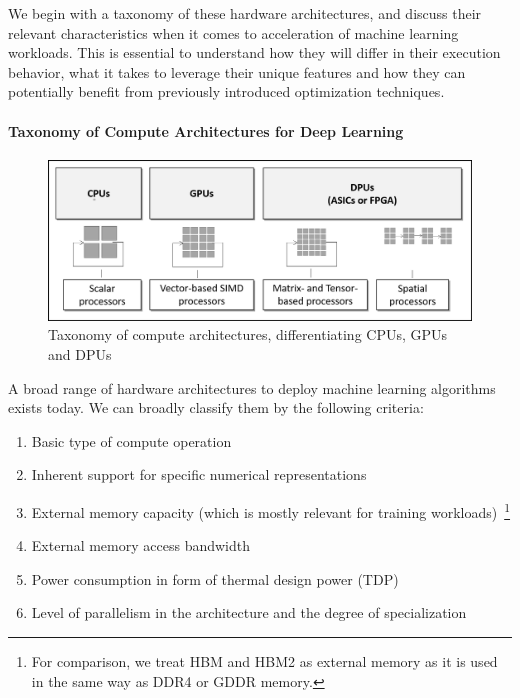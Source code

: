 We begin with a taxonomy of these hardware architectures, and discuss their relevant characteristics when it comes to acceleration of machine learning workloads. 
This is essential to understand how they will differ in their execution behavior, what it takes to leverage their unique features and how they can potentially benefit from previously introduced optimization techniques. 

\paragraph{Taxonomy of Compute Architectures for Deep Learning}

\begin{figure}
\centering
\includegraphics[width=0.8\linewidth]{figures/taxonomy.png}
\caption{Taxonomy of compute architectures, differentiating CPUs, GPUs and DPUs}
\label{fig:tax}
\end{figure}

A broad range of hardware architectures to deploy machine learning algorithms exists today.
We can broadly classify them by the following criteria:

\begin{enumerate}[itemsep=-1pt]
\item Basic type of compute operation
\item Inherent support for specific numerical representations
\item External memory capacity (which is mostly relevant for training workloads)~\footnote{For comparison, we treat HBM and HBM2 as external memory as it is used in the same way as DDR4 or GDDR memory.}
\item External memory access bandwidth
\item Power consumption in form of thermal design power (TDP)
\item Level of parallelism in the architecture and the degree of specialization
\end{enumerate}
 
